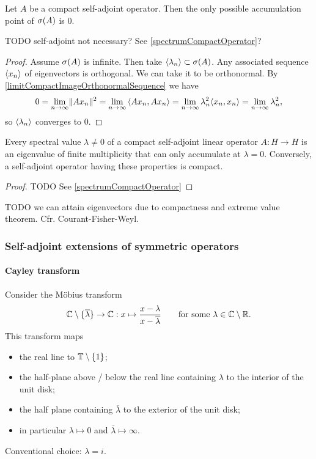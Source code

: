 \begin{proposition}
Let $A$ be a compact self-adjoint operator. Then the only possible accumulation point of $\sigma(A)$ is $0$.
\end{proposition}
TODO self-adjoint not necessary? See \ref{spectrumCompactOperator}?
\begin{proof}
Assume $\sigma(A)$ is infinite. Then take $\left\langle \lambda_n \right\rangle\subset \sigma(A)$. Any associated sequence $\left\langle x_n \right\rangle$ of eigenvectors is orthogonal. We can take it to be orthonormal. By \ref{limitCompactImageOrthonormalSequence} we have
\[ 0 = \lim_{n\to\infty} \norm{Ax_n}^2 = \lim_{n\to\infty}\inner{Ax_n,Ax_n} = \lim_{n\to\infty}\lambda_n^2\inner{x_n,x_n} = \lim_{n\to\infty}\lambda_n^2, \]
so $\left\langle \lambda_n \right\rangle$ converges to $0$.
\end{proof}

\begin{theorem}
Every spectral value $\lambda\neq 0$ of a compact self-adjoint linear
operator $A : H \to H$ is an eigenvalue of finite multiplicity that can only
accumulate at $\lambda = 0$. Conversely, a self-adjoint operator having these
properties is compact.
\end{theorem}
\begin{proof}
TODO See \ref{spectrumCompactOperator}
\end{proof}

TODO we can attain eigenvectors due to compactness and extreme value theorem. Cfr. Courant-Fisher-Weyl.

\subsubsection{Self-adjoint extensions of symmetric operators}
\paragraph{Cayley transform}
Consider the Möbius transform
\[ \mathbb{C}\setminus\{\overline{\lambda}\} \to \mathbb{C}: x\mapsto \frac{x - \lambda}{x-\overline{\lambda}} \qquad \text{for some $\lambda\in\mathbb{C}\setminus\mathbb{R}$.} \]
This transform maps
\begin{itemize}
\item the real line to $\mathbb{T}\setminus\{1\}$;
\item the half-plane above / below the real line containing $\lambda$ to the interior of the unit disk;
\item the half plane containing $\overline{\lambda}$ to the exterior of the unit disk;
\item in particular $\lambda \mapsto 0$ and $\overline{\lambda} \mapsto \infty$.
\end{itemize}
Conventional choice: $\lambda = i$.

